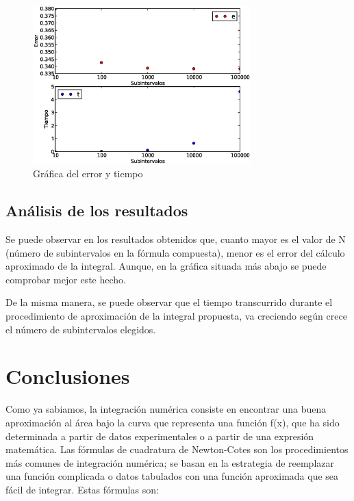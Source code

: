 \documentclass[spanish,a4paper,11pt]{report}
\begin{document}
\begin{figure}[h]
\begin{center}
\includegraphics[width=0.75\textwidth]{errortiemp.eps}
\caption{Gráfica del error y tiempo}
\label{fig:2}
\end{center}
\end{figure}

\newpage

\section{Análisis de los resultados}     
\label{chapter:analisis}

Se puede observar en los resultados obtenidos que, cuanto mayor es el valor de N (número de subintervalos en la fórmula compuesta),
menor es el error del cálculo aproximado de la integral. Aunque, en la gráfica situada más abajo se puede comprobar mejor 
este hecho. \par
De la misma manera, se puede observar que el tiempo transcurrido durante el procedimiento de aproximación de la integral 
propuesta, va creciendo según crece el número de subintervalos elegidos. 


\chapter{Conclusiones}
\label{chapter:concl}

\parindent=1cm Como ya sabiamos, la integración numérica consiste en encontrar una buena aproximación al área bajo la curva que representa una 
función f(x), que ha sido determinada a partir de datos experimentales o a partir de una expresión matemática.
Las fórmulas de cuadratura de Newton-Cotes son los procedimientos más comunes de integración numérica; se basan en la estrategia 
de reemplazar una función complicada o datos tabulados con una función aproximada que sea fácil de integrar.  
Estas fórmulas son:
\end{document}
